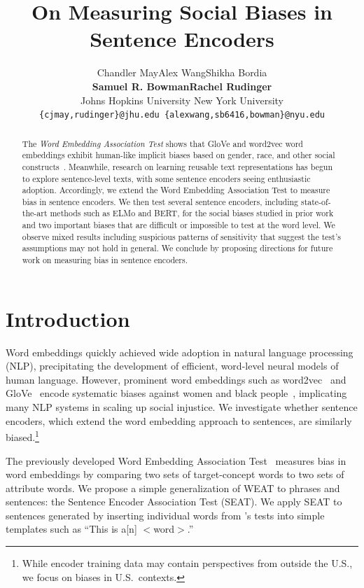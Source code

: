 \documentclass[11pt,a4paper]{article}
\title{On Measuring Social Biases in Sentence Encoders}
\author{Chandler May\jhuauthor \quad Alex Wang\nyuauthor \quad Shikha Bordia\nyuauthor \\ {\bf Samuel R. Bowman\nyuauthor \quad Rachel Rudinger\jhuauthor} \\
  \jhuauthor Johns Hopkins University \quad
  \nyuauthor New York University \\
  {\tt \{cjmay,rudinger\}@jhu.edu  \{alexwang,sb6416,bowman\}@nyu.edu} \\}
\date{}
\begin{document}
\maketitle

\begin{abstract}
The \emph{Word Embedding Association Test} shows that GloVe and word2vec word embeddings exhibit human-like implicit biases based on gender, race, and other social constructs~\citep{caliskan2017semantics}.
Meanwhile, research on learning reusable text representations has begun to explore sentence-level texts, with some sentence encoders seeing enthusiastic adoption.
Accordingly, we extend the Word Embedding Association Test to measure bias in sentence encoders.
We then test several sentence encoders, including state-of-the-art methods such as ELMo and BERT, for the social biases studied in prior work and two important biases that are difficult or impossible to test at the word level.
We observe mixed results including suspicious patterns of sensitivity that suggest the test's assumptions may not hold in general.
We conclude by proposing directions for future work on measuring bias in sentence encoders.
\end{abstract}

\section{Introduction}

Word embeddings quickly achieved wide adoption in natural language processing (NLP), precipitating the development of efficient, word-level neural models of human language.  However, prominent word embeddings such as word2vec~\cite{mikolov2013distributed} and GloVe~\cite{pennington2014glove} encode systematic biases against women and black people~\citep[][i.a.]{bolukbasi2016man,garg2018word}, implicating many NLP systems in scaling up social injustice.  We investigate whether sentence encoders, which extend the word embedding approach to sentences, are similarly biased.\footnote{
    While encoder training data may contain perspectives from outside the U.S., we focus on biases in U.S.\ contexts.
}

The previously developed Word Embedding Association Test~\citep[WEAT; ][]{caliskan2017semantics} measures bias in word embeddings by comparing two sets of target-concept words to two sets of attribute words.
We propose a simple generalization of WEAT to phrases and sentences: the Sentence Encoder Association Test (SEAT).
We apply SEAT to sentences generated by inserting individual words from \citeauthor{caliskan2017semantics}'s tests into simple templates such as ``This is a[n] $<$word$>$.''
\end{document}
